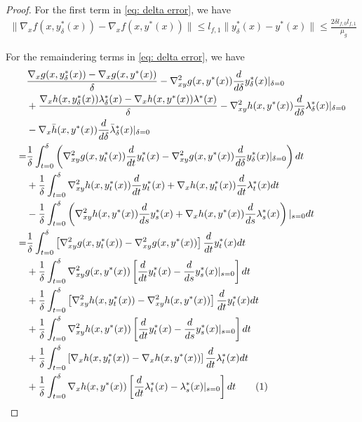 \documentclass{article}
\newcommand\numberthis{\addtocounter{equation}{1}\tag{\theequation}}
\newcommand{\pth}[1]{\left( #1 \right)}
\newcommand{\qth}[1]{\left[ #1 \right]}
\theoremstyle{plain}
\theoremstyle{definition}
\theoremstyle{remark}
\begin{document}
\begin{proof}
For the first term in \eqref{eq: delta error}, we have
\begin{align*}
    \|\nabla_x f(x, y^*_\delta(x))-\nabla_x f(x, y^*(x))\|\leq l_{f,1}\|y^*_\delta(x)-y^*(x)\|\leq \frac{2\delta l_{f,0}l_{f,1}}{\mu_g}
\end{align*}

For the remaindering terms in \eqref{eq: delta error}, we have
\begin{align*}
    &\frac{\nabla_x g(x, y^*_\delta(x))-\nabla_x g(x, y^*(x))}{\delta}-\nabla^2_{xy} g(x, y^*(x))\frac{d}{d \delta} y^*_\delta(x)|_{\delta=0}\\
    &+\frac{\nabla_x h(x, y^*_\delta(x))\lambda^*_\delta(x)-\nabla_x h(x, y^*(x))\lambda^*(x)}{\delta}-\nabla^2_{xy} h(x,y^*(x)) \frac{d}{d \delta} \lambda^*_\delta(x)|_{\delta=0}\\
    &-\nabla_x\Bar{h}(x,y^*(x))\frac{d}{d \delta} \Bar{\lambda}^*_\delta(x)|_{\delta=0}\\
    =&\frac{1}{\delta}\int_{t=0}^\delta \pth{\nabla^2_{xy} g(x, y^*_t(x))\frac{d}{d t} y^*_t(x)-\nabla^2_{xy} g(x, y^*(x))\frac{d}{d \delta} y^*_\delta(x)|_{\delta=0}}dt\\
    &+\frac{1}{\delta}\int_{t=0}^\delta \nabla^2_{xy}h(x,y^*_t(x))\frac{d}{d t} y^*_t(x)+\nabla_x h(x, y^*_t(x))\frac{d}{d t}\lambda^*_t(x)dt\\
    &-\frac{1}{\delta}\int_{t=0}^\delta\pth{\nabla^2_{xy}h(x,y^*(x))\frac{d}{d s} y^*_s(x)+\nabla_x h(x, y^*(x))\frac{d}{d s}\lambda^*_s(x)}|_{s=0} dt\\
    =&\frac{1}{\delta}\int_{t=0}^\delta \qth{\nabla^2_{xy} g(x, y^*_t(x))-\nabla^2_{xy} g(x, y^*(x))}\frac{d}{d t} y^*_t(x)dt\\
    &+ \frac{1}{\delta}\int_{t=0}^\delta\nabla^2_{xy} g(x, y^*(x))\qth{\frac{d}{d t} y^*_t(x)-\frac{d}{d s} y^*_s(x)|_{s=0}}dt\\
    &+\frac{1}{\delta}\int_{t=0}^\delta \qth{\nabla^2_{xy}h(x,y^*_t(x))-\nabla^2_{xy}h(x,y^*(x))}\frac{d}{d t} y^*_t(x)dt\\
    &+ \frac{1}{\delta}\int_{t=0}^\delta \nabla^2_{xy}h(x,y^*(x))\qth{\frac{d}{d t} y^*_t(x)-\frac{d}{d s} y^*_s(x)|_{s=0}}dt \\
    &+\frac{1}{\delta}\int_{t=0}^\delta \qth{\nabla_x h(x, y^*_t(x))-\nabla_x h(x, y^*(x))}\frac{d}{d t}\lambda^*_t(x)dt\\
    &+ \frac{1}{\delta}\int_{t=0}^\delta\nabla_x h(x, y^*(x))\qth{\frac{d}{d t}\lambda^*_t(x)-\lambda^*_s(x)|_{s=0}}dt \numberthis \label{eq: int}
\end{align*}


\end{proof}
\end{document}

